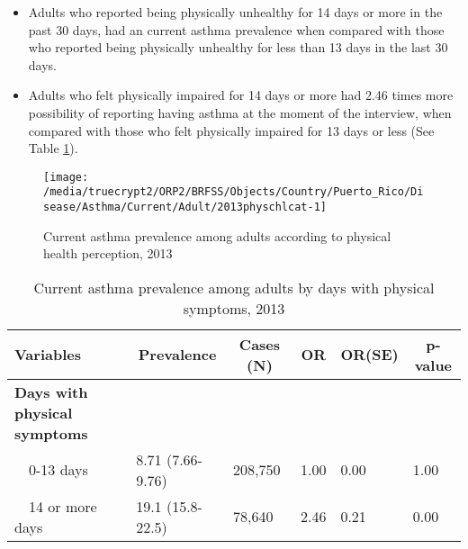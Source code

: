  
\newpage

 \newpage
\begin{itemize}

\item Adults who reported being physically unhealthy for 14 days or more in the past 30 days, had an  
 current asthma prevalence when compared with 
those who reported being physically unhealthy for less than 13 days in the last 30 days.


\item Adults who felt physically impaired for 14 days or more had 2.46 times more possibility of reporting having asthma at the moment of the interview, when compared with those who felt physically impaired for 13 days or less (See Table \ref{tab:phys.Asthma.2013}).

\end{itemize}

\begin{figure}[H]
\caption{Current asthma prevalence among adults according to physical health perception, 2013}
\label{fig:phys.Asthma.2013}
\begin{knitrout}
\color{fgcolor}

{\centering \texttt{[image: /media/truecrypt2/ORP2/BRFSS/Objects/Country/Puerto\_Rico/Disease/Asthma/Current/Adult/2013physchlcat-1]} 

}



\end{knitrout}
 \end{figure}

\begin{table}[H]
\caption{Current asthma prevalence among adults by days with physical symptoms, 2013\label{tab:phys.Asthma.2013}} 
\begin{center}
\begin{tabular}{llllll}
\hline\hline
\multicolumn{1}{l}{Variables}&\multicolumn{1}{c}{Prevalence}&\multicolumn{1}{c}{Cases (N)}&\multicolumn{1}{c}{OR}&\multicolumn{1}{c}{OR(SE)}&\multicolumn{1}{c}{p-value}\tabularnewline
\hline
{\bfseries Days with physical symptoms}&&&&&\tabularnewline
~~0-13 days&8.71 (7.66-9.76)&208,750&1.00&0.00&1.00\tabularnewline
~~14 or more days&19.1 (15.8-22.5)& 78,640&2.46&0.21&0.00\tabularnewline
\hline
\end{tabular}\end{center}

\end{table}


